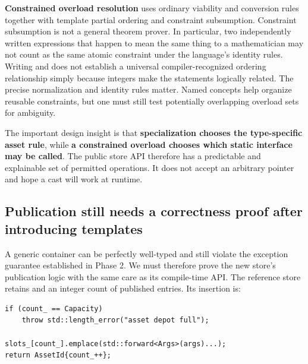 \textbf{Constrained overload resolution} uses ordinary viability and conversion rules together with template partial ordering and constraint subsumption. Constraint subsumption is not a general theorem prover. In particular, two independently written expressions that happen to mean the same thing to a mathematician may not count as the same atomic constraint under the language's identity rules. Writing  and  does not establish a universal compiler-recognized ordering relationship simply because integers make the statements logically related. The precise normalization and identity rules matter. Named concepts help organize reusable constraints, but one must still test potentially overlapping overload sets for ambiguity.

The important design insight is that \textbf{specialization chooses the type-specific asset rule}, while \textbf{a constrained overload chooses which static interface may be called}. The public store API therefore has a predictable and explainable set of permitted operations. It does not accept an arbitrary pointer and hope a cast will work at runtime.

\subsection{Publication still needs a correctness proof after introducing templates}\label{01-foundations-i-ch005-publication-still-needs-a-correctness-proof-after-introducing-templates}

\hypertarget{01-foundations-i-ch005-publication-still-needs-a-correctness-proof-after-introducing-templates}{}

A generic container can be perfectly well-typed and still violate the exception guarantee established in Phase 2. We must therefore prove the new store's publication logic with the same care as its compile-time API. The reference store retains  and an integer count of published entries. Its insertion is:

\begin{verbatim}
if (count_ == Capacity)
    throw std::length_error("asset depot full");

slots_[count_].emplace(std::forward<Args>(args)...);
return AssetId{count_++};
\end{verbatim}

